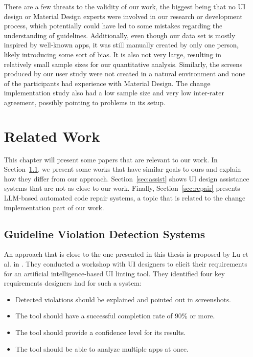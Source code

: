 \documentclass[11pt,titlepage,oneside,openany]{book}
\begin{document}
There are a few threats to the validity of our work, the biggest being that no UI design or Material Design experts were involved in our research or development process, which potentially could have led to some mistakes regarding the understanding of guidelines. Additionally, even though our data set is mostly inspired by well-known apps, it was still manually created by only one person, likely introducing some sort of bias. It is also not very large, resulting in relatively small sample sizes for our quantitative analysis. Similarly, the screens produced by our user study were not created in a natural environment and none of the participants had experience with Material Design. The change implementation study also had a low sample size and very low inter-rater agreement, possibly pointing to problems in its setup.

\chapter{Related Work}\label{cha:related}

This chapter will present some papers that are relevant to our work. In Section~\ref{sec:sim}, we present some works that have similar goals to ours and explain how they differ from our approach. Section~\ref{sec:assist} shows UI design assistance systems that are not as close to our work. Finally, Section~\ref{sec:repair} presents LLM-based automated code repair systems, a topic that is related to the change implementation part of our work.

\section{Guideline Violation Detection Systems}\label{sec:sim}

An approach that is close to the one presented in this thesis is proposed by Lu et al. in \cite{lu_ai_2024}. They conducted a workshop with UI designers to elicit their requirements for an artificial intelligence-based UI linting tool. They identified four key requirements designers had for such a system: 
\begin{itemize}
	\item Detected violations should be explained and pointed out in screenshots.
	\item The tool should have a successful completion rate of $90\%$ or more.
	\item The tool should provide a confidence level for its results.
	\item The tool should be able to analyze multiple apps at once.
\end{itemize}
\end{document}
